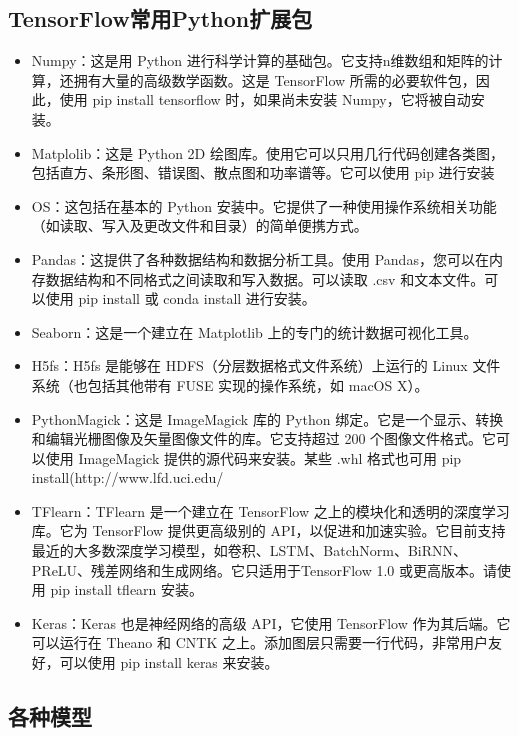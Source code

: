 \documentclass[12pt]{article}
\begin{document}
\subsection{TensorFlow常用Python扩展包}
\begin{itemize}
\setlength{\itemsep}{0pt}
\setlength{\parsep}{0pt}
\setlength{\parskip}{0pt}
    \item Numpy：这是用 Python 进行科学计算的基础包。它支持n维数组和矩阵的计算，还拥有大量的高级数学函数。这是 TensorFlow 所需的必要软件包，因此，使用 pip install tensorflow 时，如果尚未安装 Numpy，它将被自动安装。
    \item Matplolib：这是 Python 2D 绘图库。使用它可以只用几行代码创建各类图，包括直方、条形图、错误图、散点图和功率谱等。它可以使用 pip 进行安装
    \item OS：这包括在基本的 Python 安装中。它提供了一种使用操作系统相关功能（如读取、写入及更改文件和目录）的简单便携方式。
    \item Pandas：这提供了各种数据结构和数据分析工具。使用 Pandas，您可以在内存数据结构和不同格式之间读取和写入数据。可以读取 .csv 和文本文件。可以使用 pip install 或 conda install 进行安装。
    \item Seaborn：这是一个建立在 Matplotlib 上的专门的统计数据可视化工具。
    \item H5fs：H5fs 是能够在 HDFS（分层数据格式文件系统）上运行的 Linux 文件系统（也包括其他带有 FUSE 实现的操作系统，如 macOS X）。
    \item PythonMagick：这是 ImageMagick 库的 Python 绑定。它是一个显示、转换和编辑光栅图像及矢量图像文件的库。它支持超过 200 个图像文件格式。它可以使用 ImageMagick 提供的源代码来安装。某些 .whl 格式也可用 pip install(http://www.lfd.uci.edu/%
    \item TFlearn：TFlearn 是一个建立在 TensorFlow 之上的模块化和透明的深度学习库。它为 TensorFlow 提供更高级别的 API，以促进和加速实验。它目前支持最近的大多数深度学习模型，如卷积、LSTM、BatchNorm、BiRNN、PReLU、残差网络和生成网络。它只适用于TensorFlow 1.0 或更高版本。请使用 pip install tflearn 安装。
    \item Keras：Keras 也是神经网络的高级 API，它使用 TensorFlow 作为其后端。它可以运行在 Theano 和 CNTK 之上。添加图层只需要一行代码，非常用户友好，可以使用 pip install keras 来安装。
\end{itemize}

\subsection{各种模型}
\end{document}
